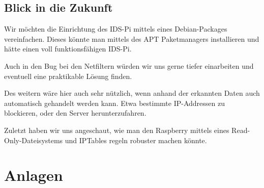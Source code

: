 \documentclass{article}
\begin{document}
\subsection{Blick in die Zukunft}
Wir möchten die Einrichtung des IDS-Pi mittels eines Debian-Packages vereinfachen. Dieses könnte man mittels des APT Paketmanagers installieren und hätte einen voll funktionsfähigen IDS-Pi.

Auch in den Bug bei den Netfiltern würden wir uns gerne tiefer einarbeiten und eventuell eine praktikable Lösung finden.

Des weitern wäre hier auch sehr nützlich, wenn anhand der erkannten Daten auch automatisch gehandelt werden kann. Etwa bestimmte IP-Addressen zu blockieren, oder den Server herunterzufahren.

Zuletzt haben wir uns angeschaut, wie man den Raspberry mittels eines Read-Only-Dateisystems und IPTables regeln robuster machen könnte.


\vfil \break

\listoffigures

\section{Anlagen}


\end{document}
